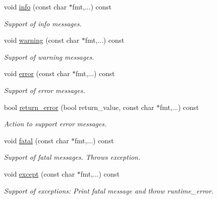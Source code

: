 \begin{DoxyCompactItemize}
void \hyperlink{class_d_d4hep_1_1_simulation_1_1_geant4_action_a30bb1539e63536cfeaddb0b5b4032214}{info} (const char $\ast$fmt,...) const 
\begin{DoxyCompactList}\small\item\em Support of info messages. \item\end{DoxyCompactList}\item 
void \hyperlink{class_d_d4hep_1_1_simulation_1_1_geant4_action_ab006988f8f6db3df39a6d90ed1e69a1d}{warning} (const char $\ast$fmt,...) const 
\begin{DoxyCompactList}\small\item\em Support of warning messages. \item\end{DoxyCompactList}\item 
void \hyperlink{class_d_d4hep_1_1_simulation_1_1_geant4_action_a2e1c04c087846bf9bf349d26667660a2}{error} (const char $\ast$fmt,...) const 
\begin{DoxyCompactList}\small\item\em Support of error messages. \item\end{DoxyCompactList}\item 
bool \hyperlink{class_d_d4hep_1_1_simulation_1_1_geant4_action_a3cdefc7063e8ca7d7fe55ebb7487daab}{return\_\-error} (bool return\_\-value, const char $\ast$fmt,...) const 
\begin{DoxyCompactList}\small\item\em Action to support error messages. \item\end{DoxyCompactList}\item 
void \hyperlink{class_d_d4hep_1_1_simulation_1_1_geant4_action_a80edeed66bdf7dc97aecb68f246a7b24}{fatal} (const char $\ast$fmt,...) const 
\begin{DoxyCompactList}\small\item\em Support of fatal messages. Throws exception. \item\end{DoxyCompactList}\item 
void \hyperlink{class_d_d4hep_1_1_simulation_1_1_geant4_action_a05d5b6e6de246d0b7a7d76f66b9dc608}{except} (const char $\ast$fmt,...) const 
\begin{DoxyCompactList}\small\item\em Support of exceptions: Print fatal message and throw runtime\_\-error. \item\end{DoxyCompactList}\item 

\end{DoxyCompactItemize}
